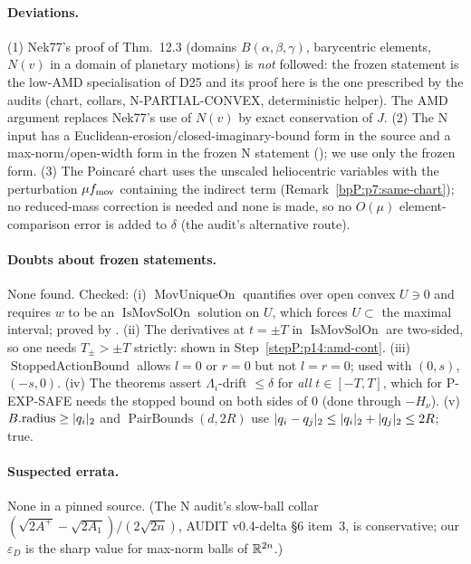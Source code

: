 \paragraph{Deviations.} (1) Nek77's proof of Thm.~12.3 (domains $B(\alpha,\beta,\gamma)$, barycentric elements, $N(v)$ in a domain of planetary motions) is \emph{not} followed: the frozen statement is the low-AMD specialisation of D25 and its proof here is the one prescribed by the audits (chart, collars, N-PARTIAL-CONVEX, deterministic helper). The AMD argument replaces Nek77's use of $N(v)$ by exact conservation of $J$. (2) The N input has a Euclidean-erosion/closed-imaginary-bound form in the source and a max-norm/open-width form in the frozen N statement (); we use only the frozen form. (3) The Poincar\'e chart uses the unscaled heliocentric variables with the perturbation $\mu f_{\rm mov}$ containing the indirect term (Remark~\ref{bpP:p7:same-chart}); no reduced-mass correction is needed and none is made, so no $O(\mu)$ element-comparison error is added to $\delta$ (the audit's alternative route).

\paragraph{Doubts about frozen statements.} None found. Checked: (i) $\operatorname{MovUniqueOn}$ quantifies over open convex $U\ni0$ and requires $w$ to be an $\operatorname{IsMovSolOn}$ solution on $U$, which forces $U\subset$ the maximal interval; proved by . (ii) The derivatives at $t=\pm T$ in $\operatorname{IsMovSolOn}$ are two-sided, so one needs $T_\pm>\pm T$ strictly: shown in Step~\ref{stepP:p14:amd-cont}. (iii) $\operatorname{StoppedActionBound}$ allows $l=0$ or $r=0$ but not $l=r=0$; used with $(0,s)$, $(-s,0)$. (iv) The theorems assert $\Lambda_i$-drift $\le\delta$ for \emph{all} $t\in[-T,T]$, which for P-EXP-SAFE needs the stopped bound on both sides of $0$ (done through $-H_\nu$). (v) $B.\mathrm{radius}\ge\lvert q_i\rvert_2$ and $\operatorname{PairBounds}(d,2R)$ use $\lvert q_i-q_j\rvert_2\le\lvert q_i\rvert_2+\lvert q_j\rvert_2\le2R$; true.

\paragraph{Suspected errata.} None in a pinned source. (The N audit's slow-ball collar $(\sqrt{2A^+}-\sqrt{2A_1})/(2\sqrt{2n})$, AUDIT v0.4-delta \S6 item~3, is conservative; our $\varepsilon_D$ is the sharp value for max-norm balls of $\mathbb{R}^{2n}$.)

